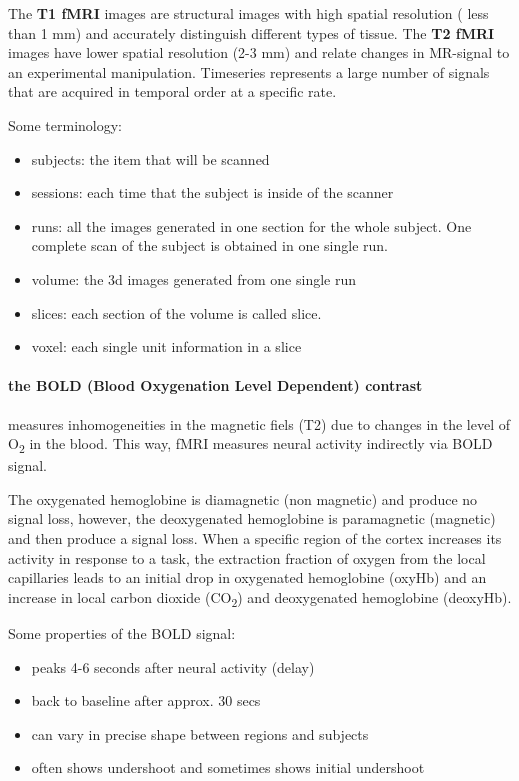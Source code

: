 \documentclass[12pt,article,oneside,a4paper]{memoir}
\begin{document}
The \textbf{T1 fMRI} images are structural images with high spatial resolution ( less than 1 mm) and accurately distinguish different types of tissue. The \textbf{T2 fMRI} images have lower spatial resolution (2-3 mm) and relate changes in MR-signal to an experimental manipulation. Timeseries represents a large number of signals that are acquired in temporal order at a specific rate.

Some terminology:
\begin{itemize}
\item subjects: the item that will be scanned
\item sessions: each time that the subject is inside of the scanner
\item runs: all the images generated in one section for the whole subject. One complete scan of the subject is obtained in one single run.
\item volume: the 3d images generated from one single run
\item slices: each section of the volume is called slice.
\item voxel: each single unit information in a slice
\end{itemize}

\paragraph{the BOLD (Blood Oxygenation Level Dependent) contrast} measures inhomogeneities in the magnetic fiels (T2) due to changes in the level of O\textsubscript{2} in the blood. This way, fMRI measures neural activity indirectly via BOLD signal.

The oxygenated hemoglobine is diamagnetic (non magnetic) and produce no signal loss, however, the deoxygenated hemoglobine is paramagnetic (magnetic) and then produce a signal loss. When a specific region of the cortex increases its activity in response to a task, the extraction fraction of oxygen from the local capillaries leads to an initial drop in oxygenated hemoglobine (oxyHb) and an increase in local carbon dioxide (CO\textsubscript{2}) and deoxygenated hemoglobine (deoxyHb). 

Some properties of the BOLD signal:
\begin{itemize}
\item peaks 4-6 seconds after neural activity (delay)
\item back to baseline after approx. 30 secs
\item can vary in precise shape between regions and subjects
\item often shows undershoot and sometimes shows initial undershoot
\end{itemize}
\end{document}
